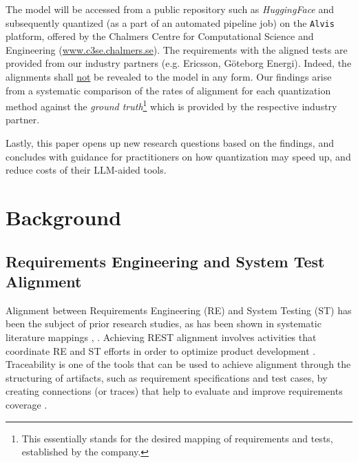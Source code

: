 \documentclass[conference]{IEEEtran}
\begin{document}
The model will be accessed from a public repository such as \textit{HuggingFace}
and subsequently quantized (as a part of an automated pipeline job) on the
\verb|Alvis| platform, offered by the Chalmers Centre for Computational Science
and Engineering (\url{www.c3se.chalmers.se}).
The requirements with the aligned tests are provided from our industry partners
(e.g. Ericsson, G\"oteborg Energi). Indeed, the alignments shall
\underline{not} be revealed to the model in any form. Our findings arise from a
systematic comparison of the rates of alignment for each quantization method
against the \textit{ground truth}\footnote{This essentially stands for the
desired mapping of requirements and tests, established by the company.} which is provided by the respective
industry partner.

Lastly, this paper opens up new research questions based on the findings, and concludes with guidance for practitioners on how quantization may speed up, and reduce costs of their LLM-aided tools.


\section{Background}\label{background}

\subsection{Requirements Engineering and System Test Alignment}

Alignment between Requirements Engineering (RE) and System Testing (ST) has been the subject of prior research studies, as has been shown in systematic literature mappings \cite{barmi_alignment_2011}, \cite{karhapaa_what_2017}. Achieving REST alignment involves activities that coordinate RE and ST efforts in order to optimize product development \cite{unterkalmsteinerTaxonomyRequirementsEngineering2014}. Traceability is one of the tools that can be used to achieve alignment through the structuring of artifacts, such as requirement specifications and test cases, by creating connections (or traces) that help to evaluate and improve requirements coverage \cite{bjarnasonChallengesPracticesAligning2014}. 
\end{document}
